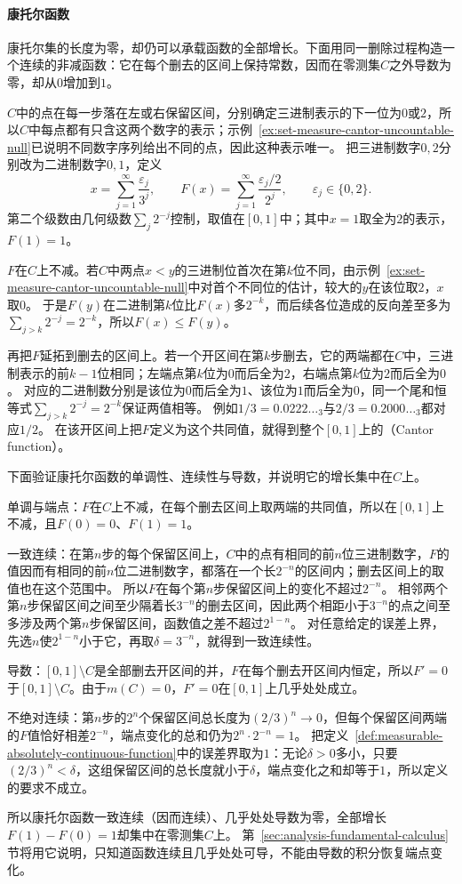 \paragraph{康托尔函数}
\label{sec:analysis-cantor-function}
康托尔集的长度为零，却仍可以承载函数的全部增长。下面用同一删除过程构造一个连续的非减函数：它在每个删去的区间上保持常数，因而在零测集$C$之外导数为零，却从$0$增加到$1$。

$C$中的点在每一步落在左或右保留区间，分别确定三进制表示的下一位为$0$或$2$，所以$C$中每点都有只含这两个数字的表示；示例~\ref{ex:set-measure-cantor-uncountable-null}已说明不同数字序列给出不同的点，因此这种表示唯一。
把三进制数字$0,2$分别改为二进制数字$0,1$，定义
\[
 x=\sum_{j=1}^\infty\frac{\varepsilon_j}{3^j},\qquad
 F(x)=\sum_{j=1}^\infty\frac{\varepsilon_j/2}{2^j},
 \qquad\varepsilon_j\in\{0,2\}.
\]
第二个级数由几何级数$\sum_j2^{-j}$控制，取值在$[0,1]$中；其中$x=1$取全为$2$的表示，$F(1)=1$。

$F$在$C$上不减。若$C$中两点$x<y$的三进制位首次在第$k$位不同，由示例~\ref{ex:set-measure-cantor-uncountable-null}中对首个不同位的估计，较大的$y$在该位取$2$，$x$取$0$。
于是$F(y)$在二进制第$k$位比$F(x)$多$2^{-k}$，而后续各位造成的反向差至多为$\sum_{j>k}2^{-j}=2^{-k}$，所以$F(x)\leq F(y)$。

再把$F$延拓到删去的区间上。若一个开区间在第$k$步删去，它的两端都在$C$中，三进制表示的前$k-1$位相同；左端点第$k$位为$0$而后全为$2$，右端点第$k$位为$2$而后全为$0$。
对应的二进制数分别是该位为$0$而后全为$1$、该位为$1$而后全为$0$，同一个尾和恒等式$\sum_{j>k}2^{-j}=2^{-k}$保证两值相等。
例如$1/3=0.0222\ldots_3$与$2/3=0.2000\ldots_3$都对应$1/2$。
在该开区间上把$F$定义为这个共同值，就得到整个$[0,1]$上的（Cantor function）。

下面验证康托尔函数的单调性、连续性与导数，并说明它的增长集中在$C$上。
\begin{example}[康托尔函数的连续性与导数]
单调与端点：$F$在$C$上不减，在每个删去区间上取两端的共同值，所以在$[0,1]$上不减，且$F(0)=0$、$F(1)=1$。

一致连续：在第$n$步的每个保留区间上，$C$中的点有相同的前$n$位三进制数字，$F$的值因而有相同的前$n$位二进制数字，都落在一个长$2^{-n}$的区间内；删去区间上的取值也在这个范围中。
所以$F$在每个第$n$步保留区间上的变化不超过$2^{-n}$。
相邻两个第$n$步保留区间之间至少隔着长$3^{-n}$的删去区间，因此两个相距小于$3^{-n}$的点之间至多涉及两个第$n$步保留区间，函数值之差不超过$2^{1-n}$。
对任意给定的误差上界，先选$n$使$2^{1-n}$小于它，再取$\delta=3^{-n}$，就得到一致连续性。

导数：$[0,1]\setminus C$是全部删去开区间的并，$F$在每个删去开区间内恒定，所以$F'=0$于$[0,1]\setminus C$。由于$m(C)=0$，$F'=0$在$[0,1]$上几乎处处成立。

不绝对连续：第$n$步的$2^n$个保留区间总长度为$(2/3)^n\to0$，但每个保留区间两端的$F$值恰好相差$2^{-n}$，端点变化的总和仍为$2^n\cdot2^{-n}=1$。
把定义~\ref{def:measurable-absolutely-continuous-function}中的误差界取为$1$：无论$\delta>0$多小，只要$(2/3)^n<\delta$，这组保留区间的总长度就小于$\delta$，端点变化之和却等于$1$，所以定义的要求不成立。
\end{example}

所以康托尔函数一致连续（因而连续）、几乎处处导数为零，全部增长$F(1)-F(0)=1$却集中在零测集$C$上。
第~\ref{sec:analysis-fundamental-calculus}节将用它说明，只知道函数连续且几乎处处可导，不能由导数的积分恢复端点变化。

\FloatBarrier
